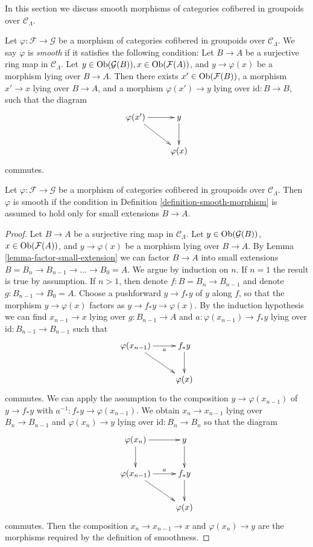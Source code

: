 \noindent
In this section we discuss smooth morphisms of categories
cofibered in groupoids over $\mathcal{C}_\Lambda$.

\begin{definition}
\label{definition-smooth-morphism}
Let $\varphi : \mathcal{F} \to \mathcal{G}$ be a morphism of categories
cofibered in groupoids over $\mathcal{C}_\Lambda$.  We say  $\varphi$ is
{\it smooth} if it satisfies the following condition: Let $B \to A$ be
a surjective ring map in $\mathcal{C}_\Lambda$.  Let $y \in
\mathop{\mathrm{Ob}}\nolimits(\mathcal{G}(B)), x \in \mathop{\mathrm{Ob}}\nolimits(\mathcal{F}(A))$, and $y
\to \varphi(x)$ be a morphism lying over $B \to A$.  Then there
exists $x' \in \mathop{\mathrm{Ob}}\nolimits(\mathcal{F}(B))$, a morphism $x' \to x$
lying over $B \to A$, and a morphism $\varphi(x') \to y$ lying
over $\text{id}: B \to B$, such that the diagram
$$
\xymatrix{
\varphi(x') \ar[r] \ar[dr] & y \ar[d] \\
& \varphi(x)
}
$$
commutes.
\end{definition}

\begin{lemma}
\label{lemma-smoothness-small-extensions}
Let $\varphi : \mathcal{F} \to \mathcal{G}$ be a morphism of categories
cofibered in groupoids over $\mathcal{C}_\Lambda$.  Then $\varphi$ is smooth
if the condition in Definition \ref{definition-smooth-morphism} is assumed to
hold only for small extensions $B \to A$.
\end{lemma}

\begin{proof}
Let $B \to A$ be a surjective ring map in $\mathcal{C}_\Lambda$.
Let $y \in \mathop{\mathrm{Ob}}\nolimits(\mathcal{G}(B))$, $x \in \mathop{\mathrm{Ob}}\nolimits(\mathcal{F}(A))$,
and $y \to \varphi(x)$ be a morphism lying over $B \to A$. By
Lemma \ref{lemma-factor-small-extension} we can factor $B \to A$ into
small extensions $B = B_n \to B_{n-1} \to \ldots \to B_0 = A$.
We argue by induction on $n$. If $n = 1$ the result is true by assumption.
If $n > 1$, then denote $f : B = B_n \to B_{n - 1}$ and denote
$g : B_{n - 1} \to B_0 = A$. Choose a pushforward
$y \to f_* y$ of $y$ along $f$, so that the morphism $y \to \varphi(x)$
factors as $y \to f_* y \to \varphi(x)$. By the induction hypothesis
we can find $x_{n - 1} \to x$ lying over $g : B_{n - 1} \to A$ and
$a : \varphi(x_{n - 1}) \to f_*y$ lying over
$\text{id} : B_{n - 1} \to B_{n - 1}$ such that
$$
\xymatrix{
\varphi(x_{n - 1}) \ar[r]_-a \ar[dr] & f_*y \ar[d] \\
& \varphi(x)
}
$$
commutes. We can apply the assumption to the composition
$y \to \varphi(x_{n - 1})$ of
$y \to f_*y$ with $a^{-1} : f_*y \to \varphi(x_{n - 1})$. We obtain
$x_n \to x_{n - 1}$ lying over $B_n \to B_{n - 1}$ and
$\varphi(x_n) \to y$ lying over  $\text{id} : B_n \to B_n$ so that the diagram
$$
\xymatrix{
\varphi(x_n) \ar[r] \ar[d] & y \ar[d] \\
\varphi(x_{n - 1}) \ar[r]^-a \ar[dr] & f_*y \ar[d] \\
& \varphi(x)
}
$$
commutes. Then the composition $x_n \to x_{n - 1} \to x$ and
$\varphi(x_n) \to y$ are the morphisms required by the definition of
smoothness.
\end{proof}


